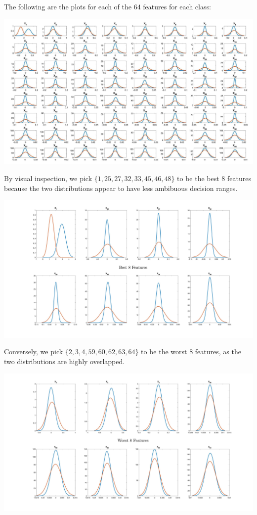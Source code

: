 \documentclass{article}
\begin{document}
The following are the plots for each of the $64$ features for each class:
\begin{center}
  \includegraphics[width=\textwidth]{feature_plots}
\end{center}

By visual inspection, we pick $\{1, 25, 27, 32, 33, 45, 46, 48\}$ to be the best $8$ features because the two distributions appear to have less ambibuous decision ranges.
\begin{center}
  \includegraphics[width=\textwidth]{best8}
\end{center}
Conversely, we pick $\{2, 3, 4, 59, 60, 62, 63, 64\}$ to be the worst $8$ features, as the two distributions are highly overlapped.
\begin{center}
  \includegraphics[width=\textwidth]{worst8}
\end{center}
\end{document}
